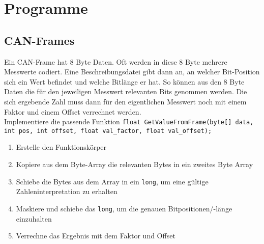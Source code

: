 \documentclass[]{scrartcl}
\begin{document}
\section{Programme}
\subsection{CAN-Frames}
Ein CAN-Frame hat 8 Byte Daten. Oft werden in diese 8 Byte mehrere Messwerte codiert. Eine Beschreibungsdatei gibt dann an, an welcher Bit-Position sich ein Wert befindet und welche Bitlänge er hat. So können aus den 8 Byte Daten die für den jeweiligen Messwert relevanten Bits genommen werden. Die sich ergebende Zahl muss dann für den eigentlichen Messwert noch mit einem Faktor und einem Offset verrechnet werden.\\

Implementiere die passende Funktion \lstinline{float GetValueFromFrame(byte[] data, int pos, int offset, float val_factor, float val_offset);}

\begin{enumerate}[{1)}]
	\item Erstelle den Funktionskörper
	\item Kopiere aus dem Byte-Array die relevanten Bytes in ein zweites Byte Array
	\item Schiebe die Bytes aus dem Array in ein \lstinline|long|, um eine gültige Zahleninterpretation zu erhalten
	\item Maskiere und schiebe das \lstinline|long|, um die genauen Bitpositionen/-länge einzuhalten
	\item Verrechne das Ergebnis mit dem Faktor und Offset
\end{enumerate}
\end{document}
